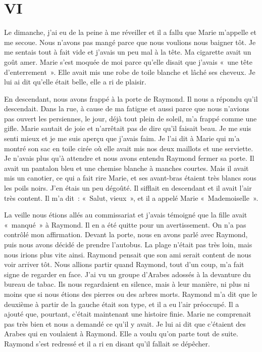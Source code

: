 \documentclass[french,twoside]{book} %
\newcommand\chapteropen{} %
\newcommand\chaptercont{} %
\begin{document}
\chapteropen
\chapter[{VI}]{VI}
\label{I6}

\chaptercont
\noindent Le dimanche, j’ai eu de la peine à me réveiller et il a fallu que Marie m’appelle et me secoue. Nous n’avons pas mangé parce que nous voulions nous baigner tôt. Je me sentais tout à fait vide et j’avais un peu mal à la tête. Ma cigarette avait un goût amer. Marie s’est moquée de moi parce qu’elle disait que j’avais « une tête d’enterrement ». Elle avait mis une robe de toile blanche et lâché ses cheveux. Je lui ai dit qu’elle était belle, elle a ri de plaisir.\par
En descendant, nous avons frappé à la porte de Raymond. Il nous a répondu qu’il descendait. Dans la rue, à cause de ma fatigue et aussi parce que nous n’avions pas ouvert les persiennes, le jour, déjà tout plein de soleil, m’a frappé comme une gifle. Marie sautait de joie et n’arrêtait pas de dire qu’il faisait beau. Je me suis senti mieux et je me suis aperçu que j’avais faim. Je l’ai dit à Marie qui m’a montré son sac en toile cirée où elle avait mis nos deux maillots et une serviette. Je n’avais plus qu’à attendre et nous avons entendu Raymond fermer sa porte. Il avait un pantalon bleu et une chemise blanche à manches courtes. Mais il avait mis un canotier, ce qui a fait rire Marie, et ses avant-bras étaient très blancs sous les poils noirs. J'en étais un peu dégoûté. Il sifflait en descendant et il avait l’air très content. Il m’a dit : « Salut, vieux », et il a appelé Marie « Mademoiselle ».\par
La veille nous étions allés au commissariat et j’avais témoigné que la fille avait « manqué » à Raymond. Il en a été quitte pour un avertissement. On n’a pas contrôlé mon affirmation. Devant la porte, nous en avons parlé avec Raymond, puis nous avons décidé de prendre l’autobus. La plage n’était pas très loin, mais nous irions plus vite ainsi. Raymond pensait que son ami serait content de nous voir arriver tôt. Nous allions partir quand Raymond, tout d’un coup, m’a fait signe de regarder en face. J'ai vu un groupe d’Arabes adossés à la devanture du bureau de tabac. Ils nous regardaient en silence, mais à leur manière, ni plus ni moins que si nous étions des pierres ou des arbres morts. Raymond m’a dit que le deuxième à partir de la gauche était son type, et il a eu l’air préoccupé. Il a ajouté que, pourtant, c’était maintenant une histoire finie. Marie ne comprenait pas très bien et nous a demandé ce qu’il y avait. Je lui ai dit que c’étaient des Arabes qui en voulaient à Raymond. Elle a voulu qu’on parte tout de suite. Raymond s’est redressé et il a ri en disant qu’il fallait se dépêcher.\par
\end{document}

